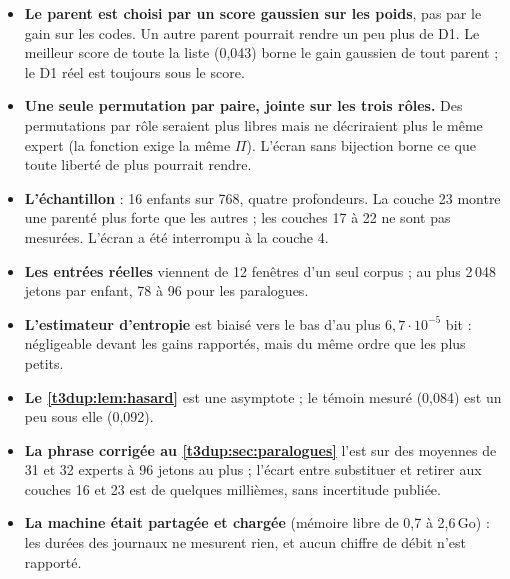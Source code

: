 \begin{faux}
\begin{itemize}
\item \textbf{Le parent est choisi par un score gaussien sur les poids}, pas par le gain sur les codes. Un autre parent pourrait rendre un peu plus de D1. Le meilleur score de toute la liste (0,043) borne le gain gaussien de tout parent ; le D1 réel est toujours sous le score.
\item \textbf{Une seule permutation par paire, jointe sur les trois rôles.} Des permutations par rôle seraient plus libres mais ne décriraient plus le même expert (la fonction exige la même $\Pi$). L'écran sans bijection borne ce que toute liberté de plus pourrait rendre.
\item \textbf{L'échantillon} : 16 enfants sur 768, quatre profondeurs. La couche 23 montre une parenté plus forte que les autres ; les couches 17 à 22 ne sont pas mesurées. L'écran a été interrompu à la couche 4.
\item \textbf{Les entrées réelles} viennent de 12 fenêtres d'un seul corpus ; au plus 2\,048 jetons par enfant, 78 à 96 pour les paralogues.
\item \textbf{L'estimateur d'entropie} est biaisé vers le bas d'au plus $6{,}7\cdot10^{-5}$ bit : négligeable devant les gains rapportés, mais du même ordre que les plus petits.
\item \textbf{Le \cref{t3dup:lem:hasard}} est une asymptote ; le témoin mesuré (0,084) est un peu sous elle (0,092).
\item \textbf{La phrase corrigée au \cref{t3dup:sec:paralogues}} l'est sur des moyennes de 31 et 32 experts à 96 jetons au plus ; l'écart entre substituer et retirer aux couches 16 et 23 est de quelques millièmes, sans incertitude publiée.
\item \textbf{La machine était partagée et chargée} (mémoire libre de 0,7 à 2,6\,Go) : les durées des journaux ne mesurent rien, et aucun chiffre de débit n'est rapporté.
\end{itemize}
\end{faux}
